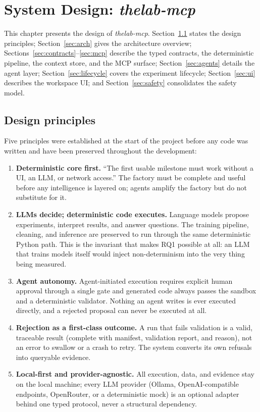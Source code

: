 \chapter{System Design: \emph{thelab-mcp}}
\label{ch:design}

This chapter presents the design of \emph{thelab-mcp}. Section~\ref{sec:principles} states the design principles; Section~\ref{sec:arch} gives the architecture overview; Sections~\ref{sec:contracts}--\ref{sec:mcp} describe the typed contracts, the deterministic pipeline, the context store, and the MCP surface; Section~\ref{sec:agents} details the agent layer; Section~\ref{sec:lifecycle} covers the experiment lifecycle; Section~\ref{sec:ui} describes the workspace UI; and Section~\ref{sec:safety} consolidates the safety model.

\section{Design principles}
\label{sec:principles}

Five principles were established at the start of the project before any code was written and have been preserved throughout the development:

\begin{enumerate}
	\item \textbf{Deterministic core first.} ``The first usable milestone must work without a UI, an LLM, or network access.'' The factory must be complete and useful before any intelligence is layered on; agents amplify the factory but do not substitute for it.
	\item \textbf{LLMs decide; deterministic code executes.} Language models propose experiments, interpret results, and answer questions. The training pipeline, cleaning, and inference are preserved to run through the same deterministic Python path. This is the invariant that makes RQ1 possible at all: an LLM that trains models itself would inject non-determinism into the very thing being measured.
	\item \textbf{Agent autonomy.} Agent-initiated execution requires explicit human approval through a single gate and generated code always passes the sandbox and a deterministic validator. Nothing an agent writes is ever executed directly, and a rejected proposal can never be executed at all.
	\item \textbf{Rejection as a first-class outcome.} A run that fails validation is a valid, traceable result (complete with manifest, validation report, and reason), not an error to swallow or a crash to retry. The system converts its own refusals into queryable evidence.
	\item \textbf{Local-first and provider-agnostic.} All execution, data, and evidence stay on the local machine; every LLM provider (Ollama, OpenAI-compatible endpoints, OpenRouter, or a deterministic mock) is an optional adapter behind one typed protocol, never a structural dependency.
\end{enumerate}


